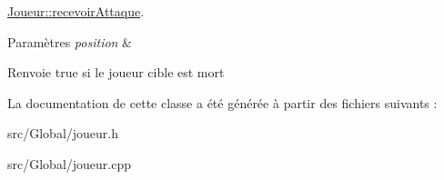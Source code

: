 \hyperlink{class_joueur_a6dff19070bdd6e9f1fdbac056a563b08}{Joueur\+::recevoir\+Attaque}. 


\begin{DoxyParams}{Paramètres}
{\em position} & \\
\hline
\end{DoxyParams}
\begin{DoxyReturn}{Renvoie}
true si le joueur cible est mort 
\end{DoxyReturn}


La documentation de cette classe a été générée à partir des fichiers suivants \+:\begin{DoxyCompactItemize}
\item 
src/\+Global/joueur.\+h\item 
src/\+Global/joueur.\+cpp\end{DoxyCompactItemize}
